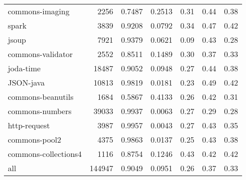 \begin{table*}
\begin{tabular}{lrrrrrr}
        commons-imaging &    2256 &          0.7487 &          0.2513 &         0.31 &         0.44 &             0.38 \\
                  spark &    3839 &          0.9208 &          0.0792 &         0.34 &         0.47 &             0.42 \\
                  jsoup &    7921 &          0.9379 &          0.0621 &         0.09 &         0.43 &             0.28 \\
      commons-validator &    2552 &          0.8511 &          0.1489 &         0.30 &         0.37 &             0.33 \\
              joda-time &   18487 &          0.9052 &          0.0948 &         0.27 &         0.44 &             0.38 \\
              JSON-java &   10813 &          0.9819 &          0.0181 &         0.23 &         0.49 &             0.42 \\
      commons-beanutils &    1684 &          0.5867 &          0.4133 &         0.26 &         0.42 &             0.31 \\
        commons-numbers &   39033 &          0.9937 &          0.0063 &         0.27 &         0.29 &             0.28 \\
           http-request &    3987 &          0.9957 &          0.0043 &         0.27 &         0.43 &             0.35 \\
          commons-pool2 &    4375 &          0.9863 &          0.0137 &         0.25 &         0.43 &             0.38 \\
   commons-collections4 &    1116 &          0.8754 &          0.1246 &         0.43 &         0.42 &             0.42 \\
                    all &  144947 &          0.9049 &          0.0951 &         0.26 &         0.37 &             0.33 \\
\bottomrule
\end{tabular}
\end{table*}
